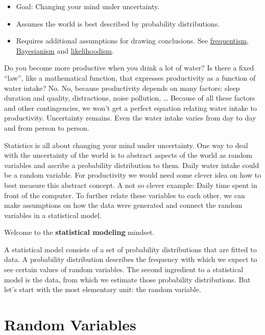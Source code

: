 \documentclass[
  10pt,
]{scrbook}
\providecommand{\tightlist}{%
  \setlength{\itemsep}{0pt}\setlength{\parskip}{0pt}}
\begin{document}
\begin{itemize}
\tightlist
\item
  Goal: Changing your mind under uncertainty.
\item
  Assumes the world is best described by probability distributions.
\item
  Requires additional assumptions for drawing conclusions. See \protect\hyperlink{frequentism}{frequentism}, \protect\hyperlink{bayesian}{Bayesianism} and \protect\hyperlink{likelihoodism}{likelihoodism}.
\end{itemize}

Do you become more productive when you drink a lot of water?
Is there a fixed ``law'', like a mathematical function, that expresses productivity as a function of water intake?
No.
No, because productivity depends on many factors: sleep duration and quality, distractions, noise pollution, \ldots{}
Because of all these factors and other contingencies, we won't get a perfect equation relating water intake to productivity.
Uncertainty remains.
Even the water intake varies from day to day and from person to person.

Statistics is all about changing your mind under uncertainty.
One way to deal with the uncertainty of the world is to abstract aspects of the world as random variables and ascribe a probability distribution to them.
Daily water intake could be a random variable.
For productivity we would need some clever idea on how to best measure this abstract concept.
A not so clever example: Daily time spent in front of the computer.
To further relate these variables to each other, we can make assumptions on how the data were generated and connect the random variables in a statistical model.

Welcome to the \textbf{statistical modeling} mindset.

A statistical model consists of a set of probability distributions that are fitted to data.
A probability distribution describes the frequency with which we expect to see certain values of random variables.
The second ingredient to a statistical model is the data, from which we estimate those probability distributions.
But let's start with the most elementary unit: the random variable.

\hypertarget{random-variables}{%
\section{Random Variables}\label{random-variables}}
\end{document}
